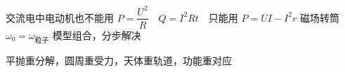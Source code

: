 交流电中电动机也不能用 $P=\dfrac{U^2}{R}$　$Q=I^2Rt$　只能用 $P=UI-I^2r$ %
磁场转筒　$\omega_0=\omega_{\text{粒子}}$ %
模型组合，分步解决

平抛重分解，圆周重受力，天体重轨道，功能重对应
